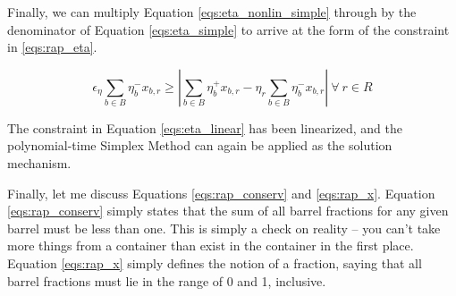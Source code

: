 Finally, we can multiply Equation \ref{eqs:eta_nonlin_simple} through by the
denominator of Equation \ref{eqs:eta_simple} to arrive at the form of the
constraint in \ref{eqs:rap_eta}.

\begin{equation}
\label{eqs:eta_linear}
\epsilon_{\eta} \sum_{b \in B} \eta_{b}^{-} x_{b,r} \geq
\left| \sum_{b \in B} \eta_{b}^{+} x_{b,r}
- \eta_{r} \sum_{b \in B} \eta_{b}^{-} x_{b,r} \right|
\: \forall \: r \in R
\end{equation}

The constraint in Equation \ref{eqs:eta_linear} has been linearized, and the
polynomial-time Simplex Method can again be applied as the solution mechanism. 

Finally, let me discuss Equations \ref{eqs:rap_conserv} and \ref{eqs:rap_x}.
Equation \ref{eqs:rap_conserv} simply states that the sum of all barrel
fractions for any given barrel must be less than one. This is simply a check on
reality -- you can't take more things from a container than exist in the
container in the first place. Equation \ref{eqs:rap_x} simply defines the notion of
a fraction, saying that all barrel fractions must lie in the range of 0 and 1,
inclusive.
